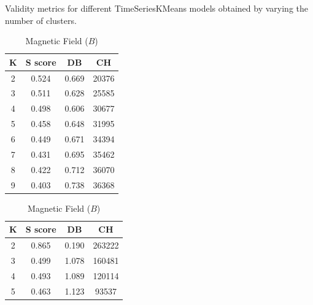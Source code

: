 \begin{table}[h]
    \caption[Validity Scores for TimeSeriesKmeans]{Validity metrics for different TimeSeriesKMeans models obtained by varying the number of clusters.}
    \begin{subtable}[h]{0.48\textwidth}
        \centering
        \begin{tabular}{@{}cccc@{}}
            \toprule
            \textbf{K} & \textbf{S score} & \textbf{DB} & \textbf{CH} \\ \midrule
            2          & 0.524               & 0.669                   & 20376                  \\
            3          & 0.511               & 0.628                   & 25585                  \\
            4          & 0.498               & 0.606                   & 30677                  \\
            5          & 0.458               & 0.648                   & 31995                  \\
            6          & 0.449               & 0.671                   & 34394                  \\
            7          & 0.431               & 0.695                   & 35462                  \\
            8          & 0.422               & 0.712                   & 36070                  \\
            9          & 0.403               & 0.738                   & 36368                  \\ \bottomrule
        \end{tabular}
        \caption{Magnetic Field ($B$)}
        \label{tab:tskmeans_b}
    \end{subtable}
    \hfill
    \begin{subtable}[h]{0.48\textwidth}
        \centering
        \begin{tabular}{@{}cccc@{}}
            \toprule
            \textbf{K} & \textbf{S score} & \textbf{DB} & \textbf{CH} \\ \midrule
            2          & 0.865               & 0.190                   & 263222                 \\
            3          & 0.499               & 1.078                   & 160481                 \\
            4          & 0.493               & 1.089                   & 120114                 \\
            5          & 0.463               & 1.123                   & 93537                  \\

\end{tabular}
\end{subtable}
\end{table}
